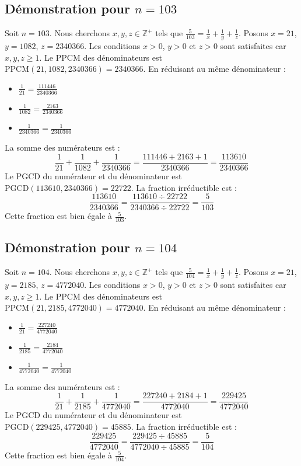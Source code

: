 \documentclass[11pt,a4paper]{article}
\begin{document}
\subsection{Démonstration pour $n = 103$}
Soit $n = 103$. Nous cherchons $x, y, z \in \mathbb{Z}^{+}$ tels que $\frac{5}{103} = \frac{1}{x} + \frac{1}{y} + \frac{1}{z}$.
Posons $x = 21$, $y = 1082$, $z = 2340366$.
Les conditions $x > 0$, $y > 0$ et $z > 0$ sont satisfaites car $x, y, z \geq 1$.
Le PPCM des dénominateurs est $\text{PPCM}(21, 1082, 2340366) = 2340366$.
En réduisant au même dénominateur :
\begin{itemize}
    \item $\frac{1}{21} = \frac{111446}{2340366}$
    \item $\frac{1}{1082} = \frac{2163}{2340366}$
    \item $\frac{1}{2340366} = \frac{1}{2340366}$
\end{itemize}
La somme des numérateurs est :
$$ \frac{1}{21} + \frac{1}{1082} + \frac{1}{2340366} = \frac{111446 + 2163 + 1}{2340366} = \frac{113610}{2340366} $$
Le PGCD du numérateur et du dénominateur est $\text{PGCD}(113610, 2340366) = 22722$.
La fraction irréductible est :
$$ \frac{113610}{2340366} = \frac{113610 \div 22722}{2340366 \div 22722} = \frac{5}{103} $$
Cette fraction est bien égale à $\frac{5}{103}$.

\subsection{Démonstration pour $n = 104$}
Soit $n = 104$. Nous cherchons $x, y, z \in \mathbb{Z}^{+}$ tels que $\frac{5}{104} = \frac{1}{x} + \frac{1}{y} + \frac{1}{z}$.
Posons $x = 21$, $y = 2185$, $z = 4772040$.
Les conditions $x > 0$, $y > 0$ et $z > 0$ sont satisfaites car $x, y, z \geq 1$.
Le PPCM des dénominateurs est $\text{PPCM}(21, 2185, 4772040) = 4772040$.
En réduisant au même dénominateur :
\begin{itemize}
    \item $\frac{1}{21} = \frac{227240}{4772040}$
    \item $\frac{1}{2185} = \frac{2184}{4772040}$
    \item $\frac{1}{4772040} = \frac{1}{4772040}$
\end{itemize}
La somme des numérateurs est :
$$ \frac{1}{21} + \frac{1}{2185} + \frac{1}{4772040} = \frac{227240 + 2184 + 1}{4772040} = \frac{229425}{4772040} $$
Le PGCD du numérateur et du dénominateur est $\text{PGCD}(229425, 4772040) = 45885$.
La fraction irréductible est :
$$ \frac{229425}{4772040} = \frac{229425 \div 45885}{4772040 \div 45885} = \frac{5}{104} $$
Cette fraction est bien égale à $\frac{5}{104}$.
\end{document}

